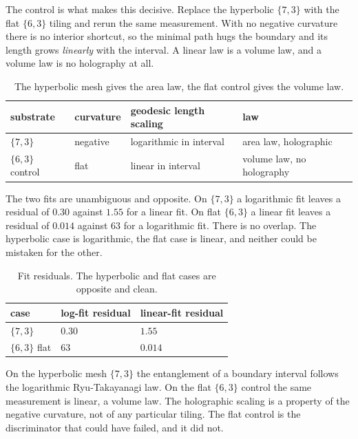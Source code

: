 The control is what makes this decisive. Replace the hyperbolic $\{7,3\}$ with the flat $\{6,3\}$ tiling and rerun the same measurement. With no negative curvature there is no interior shortcut, so the minimal path hugs the boundary and its length grows \emph{linearly} with the interval. A linear law is a volume law, and a volume law is no holography at all.

\begin{table}[ht]
\centering
\begin{tabular}{@{}llll@{}}
\toprule
substrate & curvature & geodesic length scaling & law \\
\midrule
$\{7,3\}$ & negative & logarithmic in interval & area law, holographic \\
$\{6,3\}$ control & flat & linear in interval & volume law, no holography \\
\bottomrule
\end{tabular}
\caption{The hyperbolic mesh gives the area law, the flat control gives the volume law.}
\label{tab:hol-rt}
\end{table}

The two fits are unambiguous and opposite. On $\{7,3\}$ a logarithmic fit leaves a residual of $0.30$ against $1.55$ for a linear fit. On flat $\{6,3\}$ a linear fit leaves a residual of $0.014$ against $63$ for a logarithmic fit. There is no overlap. The hyperbolic case is logarithmic, the flat case is linear, and neither could be mistaken for the other.

\begin{table}[ht]
\centering
\begin{tabular}{@{}lll@{}}
\toprule
case & log-fit residual & linear-fit residual \\
\midrule
$\{7,3\}$ & $0.30$ & $1.55$ \\
$\{6,3\}$ flat & $63$ & $0.014$ \\
\bottomrule
\end{tabular}
\caption{Fit residuals. The hyperbolic and flat cases are opposite and clean.}
\label{tab:hol-residuals}
\end{table}

\begin{result}
On the hyperbolic mesh $\{7,3\}$ the entanglement of a boundary interval follows the logarithmic Ryu-Takayanagi law. On the flat $\{6,3\}$ control the same measurement is linear, a volume law. The holographic scaling is a property of the negative curvature, not of any particular tiling. The flat control is the discriminator that could have failed, and it did not.
\end{result}

